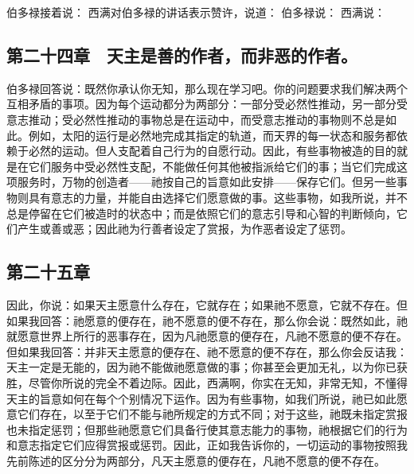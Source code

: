 伯多禄接着说： 西满对伯多禄的讲话表示赞许，说道： 伯多禄说： 西满说：\par


\subsection{第二十四章　天主是善的作者，而非恶的作者。}

伯多禄回答说：既然你承认你无知，那么现在学习吧。你的问题要求我们解决两个互相矛盾的事项。因为每个运动都分为两部分：一部分受必然性推动，另一部分受意志推动；受必然性推动的事物总是在运动中，而受意志推动的事物则不总是如此。例如，太阳的运行是必然地完成其指定的轨道，而天界的每一状态和服务都依赖于必然的运动。但人支配着自己行为的自愿行动。因此，有些事物被造的目的就是在它们服务中受必然性支配，不能做任何其他被指派给它们的事；当它们完成这项服务时，万物的创造者——祂按自己的旨意如此安排——保存它们。但另一些事物则具有意志的力量，并能自由选择它们愿意做的事。这些事物，如我所说，并不总是停留在它们被造时的状态中；而是依照它们的意志引导和心智的判断倾向，它们产生或善或恶；因此祂为行善者设定了赏报，为作恶者设定了惩罚。\par


\subsection{第二十五章　}

因此，你说：如果天主愿意什么存在，它就存在；如果祂不愿意，它就不存在。但如果我回答：祂愿意的便存在，祂不愿意的便不存在，那么你会说：既然如此，祂就愿意世界上所行的恶事存在，因为凡祂愿意的便存在，凡祂不愿意的便不存在。但如果我回答：并非天主愿意的便存在、祂不愿意的便不存在，那么你会反诘我：天主一定是无能的，因为祂不能做祂愿意做的事；你甚至会更加无礼，以为你已获胜，尽管你所说的完全不着边际。因此，西满啊，你实在无知，非常无知，不懂得天主的旨意如何在每个个别情况下运作。因为有些事物，如我们所说，祂已如此愿意它们存在，以至于它们不能与祂所规定的方式不同；对于这些，祂既未指定赏报也未指定惩罚；但那些祂愿意它们具备行使其意志能力的事物，祂根据它们的行为和意志指定它们应得赏报或惩罚。因此，正如我告诉你的，一切运动的事物按照我先前陈述的区分分为两部分，凡天主愿意的便存在，凡祂不愿意的便不存在。\par

